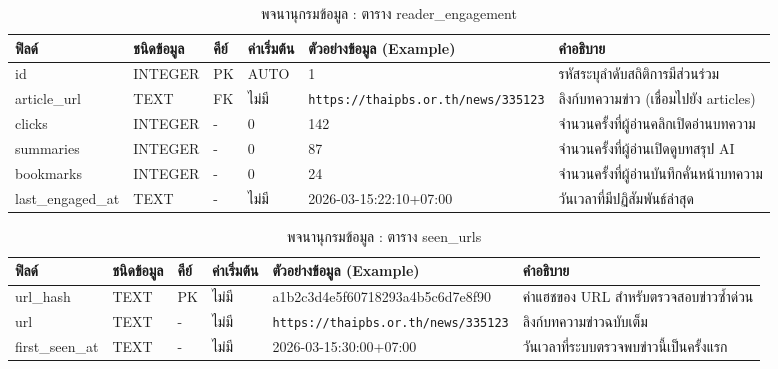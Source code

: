 \begin{table}[H]
\centering
\caption{พจนานุกรมข้อมูล : ตาราง reader\_\allowbreak engagement}
\label{tab_schema_reader_engagement}
\begin{tabularx}{\textwidth}{|L{2.5cm}|C{1.6cm}|C{0.8cm}|C{1.6cm}|L{3.1cm}|Y|}
\hline
\textbf{ฟิลด์} & \textbf{ชนิดข้อมูล} & \textbf{คีย์} & \textbf{ค่าเริ่มต้น} & \textbf{ตัวอย่างข้อมูล (Example)} & \textbf{คำอธิบาย} \\
\hline
id & INTEGER & PK & AUTO & 1 & รหัสระบุลำดับสถิติการมีส่วนร่วม \\ \hline
article\_\allowbreak url & TEXT & FK & ไม่มี & \nolinkurl{https://thaipbs.or.th/news/335123} & ลิงก์บทความข่าว (เชื่อมไปยัง articles) \\ \hline
clicks & INTEGER & - & 0 & 142 & จำนวนครั้งที่ผู้อ่านคลิกเปิดอ่านบทความ \\ \hline
summaries & INTEGER & - & 0 & 87 & จำนวนครั้งที่ผู้อ่านเปิดดูบทสรุป AI \\ \hline
bookmarks & INTEGER & - & 0 & 24 & จำนวนครั้งที่ผู้อ่านบันทึกคั่นหน้าบทความ \\ \hline
last\_\allowbreak engaged\_\allowbreak at & TEXT & - & ไม่มี & 2026-03-15:22:10+07:00 & วันเวลาที่มีปฏิสัมพันธ์ล่าสุด \\
\hline
\end{tabularx}
\end{table}

\begin{table}[H]
\centering
\caption{พจนานุกรมข้อมูล : ตาราง seen\_\allowbreak urls}
\label{tab_schema_seen_urls}
\begin{tabularx}{\textwidth}{|L{2.5cm}|C{1.6cm}|C{0.8cm}|C{1.6cm}|L{3.1cm}|Y|}
\hline
\textbf{ฟิลด์} & \textbf{ชนิดข้อมูล} & \textbf{คีย์} & \textbf{ค่าเริ่มต้น} & \textbf{ตัวอย่างข้อมูล (Example)} & \textbf{คำอธิบาย} \\
\hline
url\_\allowbreak hash & TEXT & PK & ไม่มี & a1b2c3d4\allowbreak e5f60718\allowbreak 293a4b5c\allowbreak 6d7e8f90 & ค่าแฮชของ URL สำหรับตรวจสอบข่าวซ้ำด่วน \\ \hline
url & TEXT & - & ไม่มี & \nolinkurl{https://thaipbs.or.th/news/335123} & ลิงก์บทความข่าวฉบับเต็ม \\ \hline
first\_\allowbreak seen\_\allowbreak at & TEXT & - & ไม่มี & 2026-03-15:30:00+07:00 & วันเวลาที่ระบบตรวจพบข่าวนี้เป็นครั้งแรก \\
\hline
\end{tabularx}
\end{table}

